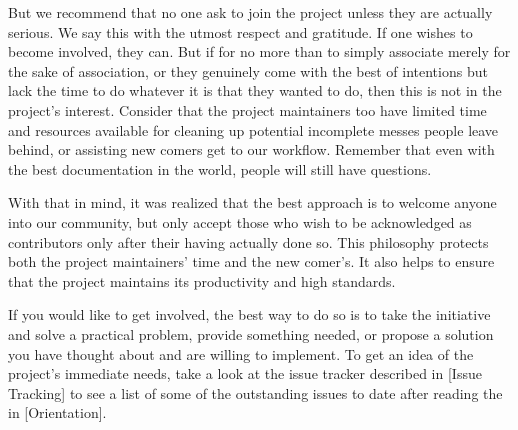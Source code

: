 But we recommend that no one ask to join the project unless they are actually serious. We say this with the utmost respect and gratitude. If one wishes to become involved, they can. But if for no more than to simply associate merely for the sake of association, or they genuinely come with the best of intentions but lack the time to do whatever it is that they wanted to do, then this is not in the project's interest. Consider that the project maintainers too have limited time and resources available for cleaning up potential incomplete messes people leave behind, or assisting new comers get  to our workflow. Remember that even with the best documentation in the world, people will still have questions.

With that in mind, it was realized that the best approach is to welcome anyone into our community, but only accept those who wish to be acknowledged as contributors only after their having actually done so. This philosophy protects both the project maintainers' time and the new comer's. It also helps to ensure that the project maintains its productivity and high standards. 

If you would like to get involved, the best way to do so is to take the initiative and solve a practical problem, provide something needed, or propose a solution you have thought about and are willing to implement. To get an idea of the project's immediate needs, take a look at the issue tracker described in [Issue Tracking] to see a list of some of the outstanding issues to date after reading the \about[Orientation] in [Orientation].

